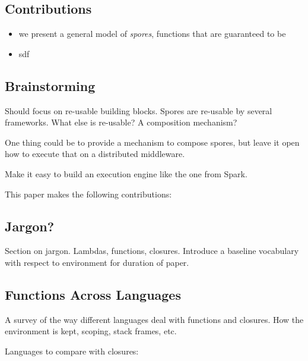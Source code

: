 \documentclass{llncs}
\begin{document}
\subsection{Contributions}

\begin{itemize}
\item we present a general model of \textit{spores}, functions that are guaranteed to be 
\item sdf
\end{itemize}

\subsection{Brainstorming}

Should focus on re-usable building blocks. Spores are re-usable by several
frameworks. What else is re-usable? A composition mechanism?

One thing could be to provide a mechanism to compose spores, but leave it open
how to execute that on a distributed middleware.

Make it easy to build an execution engine like the one from Spark.


This paper makes the following contributions:

\subsection{Jargon?}

Section on jargon. Lambdas, functions, closures. Introduce a baseline
vocabulary with respect to environment for duration of paper.

\subsection{Functions Across Languages}

A survey of the way different languages deal with functions and closures. How
the environment is kept, scoping, stack frames, etc.

Languages to compare with closures:
\end{document}
